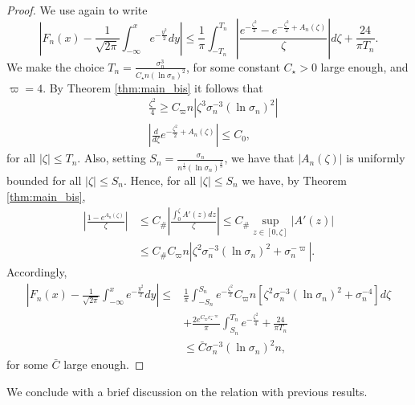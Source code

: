 \documentclass{amsart}
\numberwithin{equation}{section}
\newcommand{\Const}{C_{\#}}
\begin{document}
\begin{proof}
We use again \cite[equation (3.13) of Chapter XVI.3]{Fe2} to write
\[
\left|F_n(x)-\frac{1}{\sqrt{2\pi}}\int_{-\infty}^xe^{-\frac {y^2}2}dy\right|\leq \frac {1}\pi\int_{-T_n}^{T_n}\left|\frac{e^{-\frac{\zeta^2}2}-e^{-\frac{\zeta^2}2+A_n(\zeta)}}\zeta \right| d\zeta+ \frac{24 }{\pi T_n}.
\]
We make the choice $T_n=\frac{\sigma_n^3}{C_\star n(\ln \sigma_n)^2}$, for some constant $C_\star>0$ large enough, and $\varpi=4$. By Theorem \ref{thm:main_bis} it follows that 
\[
\begin{split}
&\frac{\zeta^2}4\geq C_\varpi n\left| \zeta^3\sigma_n^{-3}(\ln\sigma_n)^2\right|\\
&\left|\frac{d}{d\zeta} e^{-\frac{\zeta^2}2+A_n(\zeta)}\right|\leq C_0,
\end{split}
\]
for all $|\zeta|\leq T_n$.
Also, setting $S_n=\frac{\sigma_n}{n^{\frac 13}(\ln\sigma_n)^{\frac 23}}$, we have that $|A_n(\zeta)|$ is uniformly bounded for all $|\zeta|\leq S_n$. Hence,  for all $|\zeta|\leq S_n$ we have, by Theorem \ref{thm:main_bis},
\[
\begin{split}
\left|\frac{1-e^{A_n(\zeta)}}{\zeta}\right|&\leq \Const \left|\frac{\int_0^\zeta A'(z) dz}{\zeta}\right|\leq \Const\sup_{z\in[0,\zeta]} |A'(z)|\\
&\leq \Const C_\varpi n\left| \zeta^2\sigma_n^{-3}(\ln\sigma_n)^2 +\sigma_n^{-\varpi}\right|.
\end{split}
\]
Accordingly,
\[
\begin{split}
\left|F_n(x)-\frac{1}{\sqrt{2\pi}}\int_{-\infty}^xe^{-\frac {y^2}2}dy\right| \leq&  \frac {1}\pi\int_{-S_n}^{S_n}e^{-\frac{\zeta^2}2}C_\varpi n\left[ \zeta^2\sigma_n^{-3}(\ln\sigma_n)^2 +\sigma_n^{-4}\right] d\zeta\\
&+ \frac {2e^{C_\varpi c_\star^{-\varpi}}}\pi\int_{S_n}^{T_n}e^{-\frac{\zeta^2}4}+\frac{24 }{\pi T_n}\\
&\leq  \bar C \sigma_n^{-3}(\ln \sigma_n)^2 n,
\end{split}
\]
for some $\bar C$ large enough.
\end{proof}
We conclude with a brief discussion on the relation with previous results.
\end{document}
